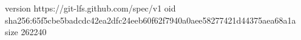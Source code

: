 version https://git-lfs.github.com/spec/v1
oid sha256:65f5cbe5badcdc42ea2dfc24eeb60f62f7940a0aee58277421d44375aea68a1a
size 262240
